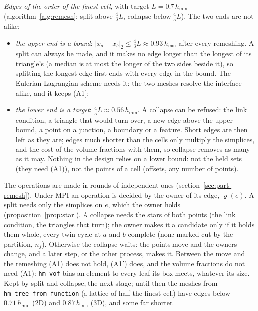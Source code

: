 \documentclass[10pt,a4paper]{article}
\theoremstyle{definition}
\newcommand{\fn}[1]{\texttt{#1}}
\begin{document}
\begin{description}[leftmargin=2.6em, style=nextline]
  \item[(E)] \emph{Edges of the order of the finest cell}, with target $L
    = 0.7\,h_{\min}$ (algorithm~\ref{alg:remesh}: split above $\tfrac43
    L$, collapse below $\tfrac45 L$). The two ends are not alike:
    \begin{itemize}
      \item \emph{the upper end is a bound}: $|x_a - x_b|_2 \le
        \tfrac43 L \approx 0.93\,h_{\min}$ after every remeshing. A split can
        always be made, and it makes no edge longer than the longest of
        its triangle's (a median is at most the longer of the two sides
        beside it), so splitting the longest edge first ends with every
        edge in the bound. The Eulerian-Lagrangian scheme needs it: the
        two meshes resolve the interface alike, and it keeps (A1);
      \item \emph{the lower end is a target}: $\tfrac45 L \approx
        0.56\,h_{\min}$. A collapse can be refused: the link condition, a
        triangle that would turn over, a new edge above the upper bound,
        a point on a junction, a boundary or a feature. Short edges are
        then left as they are; edges much shorter than the cells only
        multiply the simplices, and the cost of the volume fractions with
        them, so collapse removes as many as it may. Nothing in the
        design relies on a lower bound: not the held sets (they need
        (A1)), not the points of a cell (offsets, any number of points).
    \end{itemize}
    The operations are made in rounds of independent ones
    (section~\ref{sec:part-remesh}). Under MPI an operation is decided by
    the owner of its edge, $\varrho(e)$. A split needs only the simplices
    on $e$, which the owner holds (proposition~\ref{prop:star}). A
    collapse needs the stars of both points (the link condition, the
    triangles that turn); the owner makes it a candidate only if it holds
    them whole, every twin cycle at $a$ and $b$ complete (none marked cut
    by the partition, $n_f$). Otherwise the collapse waits: the points move
    and the owners change, and a later step, or the other process, makes
    it. Between the move and the
    remeshing (A1) does not hold, (A1$'$) does, and the volume fractions
    do not need (A1): \fn{hm\_vof} bins an element to every leaf its box
    meets, whatever its size.
    Kept by split and collapse, the next stage; until then the meshes from
    \fn{hm\_tree\_from\_function} (a lattice of half the finest cell)
    have edges below $0.71\,h_{\min}$ (2D) and $0.87\,h_{\min}$ (3D), and
    some far shorter.
\end{description}
\end{document}
